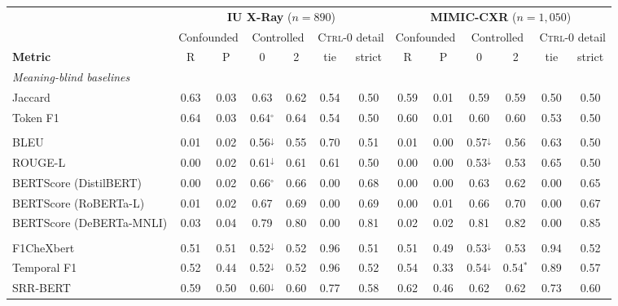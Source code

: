 \begin{tabular}{lcccccccccccc}
\toprule
 & \multicolumn{6}{c}{\textbf{IU X-Ray} ($n{=}890$)} & \multicolumn{6}{c}{\textbf{MIMIC-CXR} ($n{=}1{,}050$)} \\
\cmidrule(lr){2-7}\cmidrule(lr){8-13}
 & \multicolumn{2}{c}{Confounded} & \multicolumn{2}{c}{Controlled} & \multicolumn{2}{c}{\textsc{Ctrl-0} detail} & \multicolumn{2}{c}{Confounded} & \multicolumn{2}{c}{Controlled} & \multicolumn{2}{c}{\textsc{Ctrl-0} detail} \\
\cmidrule(lr){2-3}\cmidrule(lr){4-5}\cmidrule(lr){6-7}\cmidrule(lr){8-9}\cmidrule(lr){10-11}\cmidrule(lr){12-13}
\textbf{Metric} & \textsc{R} & \textsc{P} & \textsc{0} & \textsc{2} & tie & strict & \textsc{R} & \textsc{P} & \textsc{0} & \textsc{2} & tie & strict \\
\midrule
\multicolumn{13}{l}{\textit{Meaning-blind baselines}} \\
Jaccard & 0.63 & 0.03 & 0.63 & 0.62 & 0.54 & 0.50 & 0.59 & 0.01 & 0.59 & 0.59 & 0.50 & 0.50 \\
Token F1 & 0.64 & 0.03 & 0.64$^{\circ}$ & 0.64 & 0.54 & 0.50 & 0.60 & 0.01 & 0.60 & 0.60 & 0.53 & 0.50 \\
\addlinespace[2pt]
\multicolumn{13}{l}{\textit{Lexical / embedding}} \\
BLEU & 0.01 & 0.02 & 0.56$^{\downarrow}$ & 0.55 & 0.70 & 0.51 & 0.01 & 0.00 & 0.57$^{\downarrow}$ & 0.56 & 0.63 & 0.50 \\
ROUGE-L & 0.00 & 0.02 & 0.61$^{\downarrow}$ & 0.61 & 0.61 & 0.50 & 0.00 & 0.00 & 0.53$^{\downarrow}$ & 0.53 & 0.65 & 0.50 \\
BERTScore (DistilBERT) & 0.00 & 0.02 & 0.66$^{\circ}$ & 0.66 & 0.00 & 0.68 & 0.00 & 0.00 & 0.63 & 0.62 & 0.00 & 0.65 \\
BERTScore (RoBERTa-L) & 0.01 & 0.02 & 0.67 & 0.69 & 0.00 & 0.69 & 0.00 & 0.01 & 0.66 & 0.70 & 0.00 & 0.67 \\
BERTScore (DeBERTa-MNLI) & 0.03 & 0.04 & 0.79 & 0.80 & 0.00 & 0.81 & 0.02 & 0.02 & 0.81 & 0.82 & 0.00 & 0.85 \\
\addlinespace[2pt]
\multicolumn{13}{l}{\textit{Clinical, non-LLM}} \\
F1CheXbert & 0.51 & 0.51 & 0.52$^{\downarrow}$ & 0.52 & 0.96 & 0.51 & 0.51 & 0.49 & 0.53$^{\downarrow}$ & 0.53 & 0.94 & 0.52 \\
Temporal F1 & 0.52 & 0.44 & 0.52$^{\downarrow}$ & 0.52 & 0.96 & 0.52 & 0.54 & 0.33 & 0.54$^{\downarrow}$ & 0.54$^{\ast}$ & 0.89 & 0.57 \\
SRR-BERT & 0.59 & 0.50 & 0.60$^{\downarrow}$ & 0.60 & 0.77 & 0.58 & 0.62 & 0.46 & 0.62 & 0.62 & 0.73 & 0.60 \\

\end{tabular}
